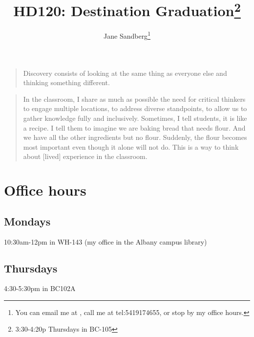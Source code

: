 \documentclass[12pt,article,oneside]{memoir}
\author{Jane Sandberg\thanks{You can email me at \htmladdnormallink{sandbej at linnbenton dot edu}{mailto:sandbej@linnbenton.edu}, call me at \htmladdnormallink{(541) 917 4655}	{tel:5419174655}, or stop by my office hours.}}
\title{HD120: Destination Graduation\thanks{3:30-4:20p Thursdays in BC-105}}
\begin{document}
\renewcommand{\labelitemi}{$\triangleright$}
\setcounter{secnumdepth}{0}
\tightlists


\maketitle


\begin{quotation}
Discovery consists of looking at the same thing as everyone else and thinking something different.

\end{quotation}

\begin{quotation}
In the classroom, I share as much as possible the need for critical thinkers to engage multiple locations, to address diverse standpoints, to allow us to gather knowledge fully and inclusively.  Sometimes, I tell students, it is like a recipe.  I tell them to imagine we are baking bread that needs flour.  And we have all the other ingredients but no flour.  Suddenly, the flour becomes most important even though it alone will not do.  This is a way to think about [lived] experience in the classroom.

\end{quotation}

\begin{htmlonly}
\tableofcontents
\end{htmlonly}
\newpage
\section{Office hours}

\subsection{Mondays}
10:30am-12pm in WH-143 (my office in the Albany campus library)

\subsection{Thursdays}
4:30-5:30pm in BC102A
\end{document}
